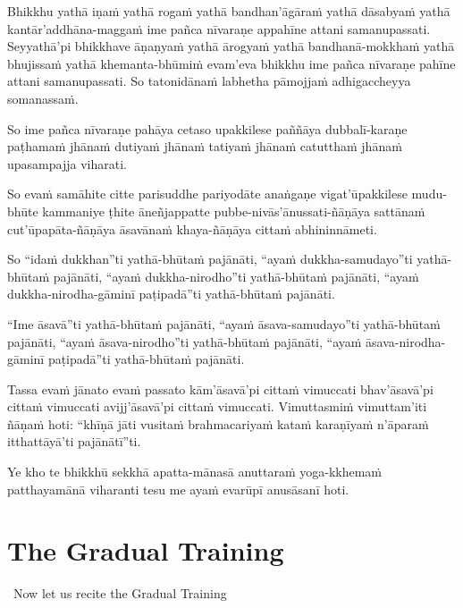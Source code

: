 \suttaRef{[MN 107]}

Bhikkhu yathā iṇaṁ yathā rogaṁ yathā bandhan'āgāraṁ yathā dāsabyaṁ yathā kantār'addhāna-maggaṁ ime pañca nīvaraṇe appahīne attani samanupassati. Seyyathā'pi bhikkhave āṇaṇyaṁ yathā ārogyaṁ yathā bandhanā-mokkhaṁ yathā bhujissaṁ yathā khemanta-bhūmiṁ evam'eva bhikkhu ime pañca nīvaraṇe pahīne attani samanupassati. So tatonidānaṁ labhetha pāmojjaṁ adhigaccheyya somanassaṁ.

So ime pañca nīvaraṇe pahāya cetaso upakkilese paññāya dubbalī-karaṇe paṭhamaṁ jhānaṁ dutiyaṁ jhānaṁ tatiyaṁ jhānaṁ catutthaṁ jhānaṁ upasampajja viharati.

\ifbfive\clearpage\fi

So evaṁ samāhite citte parisuddhe pariyodāte anaṅgaṇe vigat'ūpakkilese mudu-bhūte kammaniye ṭhite āneñjappatte pubbe-nivās'ānussati-ñāṇāya sattānaṁ cut'ūpapāta-ñāṇāya āsavānaṁ khaya-ñāṇāya cittaṁ abhininnāmeti.

\ifafive\clearpage\fi

So ``idaṁ dukkhan''ti yathā-bhūtaṁ pajānāti, ``ayaṁ dukkha-samudayo''ti yathā-bhūtaṁ pajānāti, ``ayaṁ dukkha-nirodho''ti yathā-bhūtaṁ pajānāti, ``ayaṁ dukkha-nirodha-gāminī paṭipadā''ti yathā-bhūtaṁ pajānāti.

``Ime āsavā''ti yathā-bhūtaṁ pajānāti, ``ayaṁ āsava-samudayo''ti yathā-bhūtaṁ pajānāti, ``ayaṁ āsava-nirodho''ti yathā-bhūtaṁ pajānāti, ``ayaṁ āsava-nirodha-gāminī paṭipadā''ti yathā-bhūtaṁ pajānāti.

Tassa evaṁ jānato evaṁ passato kām'āsavā'pi cittaṁ vimuccati bhav'āsavā'pi cittaṁ vimuccati avijj'āsavā'pi cittaṁ vimuccati. Vimuttasmiṁ vimuttam'iti ñāṇaṁ hoti: ``khīṇā jāti vusitaṁ brahmacariyaṁ kataṁ karaṇīyaṁ n'āparaṁ itthattāyā'ti pajānātī''ti.

\suttaRef{[MN 39]}

Ye kho te bhikkhū sekkhā apatta-mānasā anuttaraṁ yoga-kkhemaṁ patthayamānā viharanti tesu me ayaṁ evarūpī anusāsanī hoti.

\suttaRef{[MN 107]}



\section{The Gradual Training}
\label{gradual-training}

\ifninebythirteen

\begin{leader-english}
  \anglebracketleft\ \hspace{-0.5mm}Now let us recite the Gradual Training \hspace{-0.5mm}\anglebracketright\
\end{leader-english}

